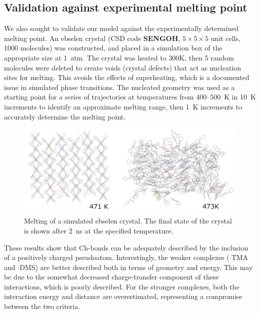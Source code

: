 \begin{refsection}
\subsection{Validation against experimental melting point}
We also sought to validate our model against the experimentally determined melting point.
An ebselen crystal (CSD code \textbf{SENGOH}, $5 \times 5 \times 5$ unit cells, 1000 molecules) was constructed, and placed in a simulation box of the appropriate size at 1~atm.
The crystal was heated to 300K, then 5 random molecules were deleted to create voids (crystal defects) that act as nucleation sites for melting.
This avoids the effects of superheating, which is a documented issue in simulated phase transitions.\autocite{???}
The nucleated geometry was used as a starting point for a series of trajectories at temperatures from 400--500~K in 10~K increments to identify an approximate melting range, then 1~K increments to accurately determine the melting point.

\begin{figure}
    \centering
    \includegraphics[width=\columnwidth]{Figures/melting.pdf}
    \caption{Melting of a simulated ebselen crystal. The final state of the crystal is shown after 2~ns at the specified temperature.}
    \label{fig:melting}
\end{figure}

These results show that Ch-bonds can be adequately described by the inclusion of a positively charged pseudoatom.
Interestingly, the weaker complexes ($\cdot$TMA and $\cdot$DMS) are better described both in terms of geometry and energy.
This may be due to the somewhat decreased charge-transfer component of these interactions, which is poorly described.
For the stronger complexes, both the interaction energy and distance are overestimated, representing a compromise between the two criteria.


\end{refsection}

